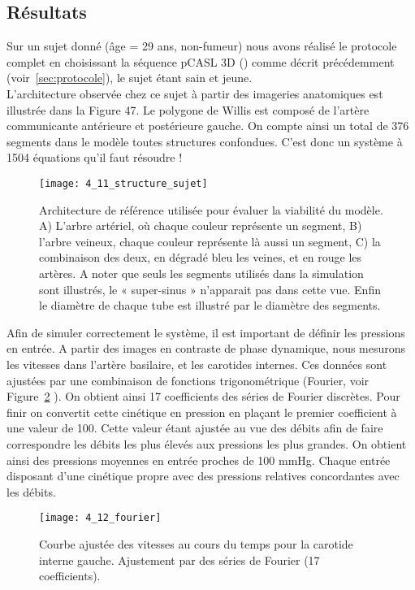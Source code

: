 \subsection{Résultats}
Sur un sujet donné (âge = 29 ans, non-fumeur) nous avons réalisé le protocole complet en
choisissant la séquence pCASL 3D (\cite{Wu2007}) comme décrit précédemment (voir~\ref{sec:protocole}), le sujet étant sain et
jeune.\\
L’architecture observée chez ce sujet à partir des imageries anatomiques est illustrée dans la
Figure 47. Le polygone de Willis est composé de l’artère communicante antérieure et postérieure
gauche. On compte ainsi un total de 376 segments dans le modèle toutes structures confondues. C’est
donc un système à 1504 équations qu’il faut résoudre !
\begin{figure}[!t]
\centering
\texttt{[image: 4\_11\_structure\_sujet]}
\caption{Architecture de référence utilisée pour évaluer la viabilité du modèle. A) L'arbre artériel, où chaque couleur
représente un segment, B) l'arbre veineux, chaque couleur représente là aussi un segment, C) la combinaison des deux, en
dégradé bleu les veines, et en rouge les artères. A noter que seuls les segments utilisés dans la simulation sont illustrés, le
« super-sinus » n’apparait pas dans cette vue. Enfin le diamètre de chaque tube est illustré par le diamètre des segments.}
\label{fig:4_11_structure_sujet}	
\end{figure}
Afin de simuler correctement le système, il est important de définir les pressions en entrée. A
partir des images en contraste de phase dynamique, nous mesurons les vitesses dans l’artère basilaire,
et les carotides internes. Ces données sont ajustées par une combinaison de fonctions trigonométrique
(Fourier, voir Figure~\ref{fig:4_12_fourier}	). On obtient ainsi 17 coefficients des séries de Fourier discrètes. Pour finir on
convertit cette cinétique en pression en plaçant le premier coefficient à une valeur de 100. Cette valeur
étant ajustée au vue des débits afin de faire correspondre les débits les plus élevés aux pressions les
plus grandes. On obtient ainsi des pressions moyennes en entrée proches de 100 mmHg. Chaque
entrée disposant d’une cinétique propre avec des pressions relatives concordantes avec les débits.\\
\begin{figure}[!t]
\centering
\texttt{[image: 4\_12\_fourier]}
\caption{Courbe ajustée des vitesses au cours du temps pour la carotide interne gauche. Ajustement par des séries de
Fourier (17 coefficients).}
\label{fig:4_12_fourier}	
\end{figure}
